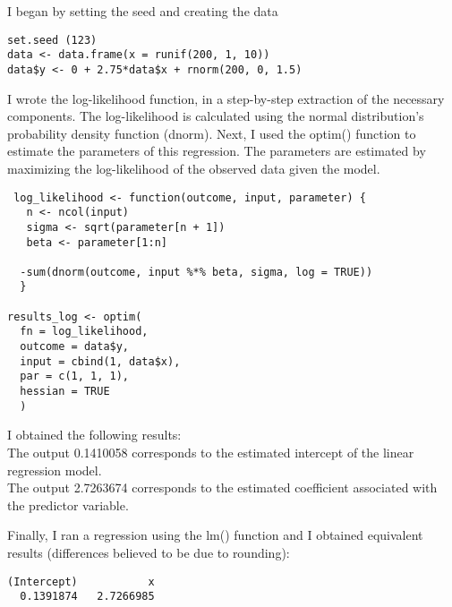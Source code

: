 \documentclass[oneside]{article}
\begin{document}
I began by setting the seed and creating the data

\begin{verbatim}
set.seed (123)
data <- data.frame(x = runif(200, 1, 10))
data$y <- 0 + 2.75*data$x + rnorm(200, 0, 1.5)

\end{verbatim}
\noindent
I wrote the log-likelihood function, in a step-by-step extraction of the necessary components. The log-likelihood is calculated using the normal distribution's probability density function (dnorm).
Next, I  used the optim() function to estimate the parameters of this regression. The parameters are estimated by maximizing the log-likelihood of the observed data given the model.

\begin{verbatim}
 log_likelihood <- function(outcome, input, parameter) {
   n <- ncol(input)
   sigma <- sqrt(parameter[n + 1])
   beta <- parameter[1:n]
  
  -sum(dnorm(outcome, input %*% beta, sigma, log = TRUE))
  }

results_log <- optim(
  fn = log_likelihood, 
  outcome = data$y, 
  input = cbind(1, data$x), 
  par = c(1, 1, 1), 
  hessian = TRUE
  )
\end{verbatim}
I obtained the following results:
\\
The output 0.1410058 corresponds to the estimated intercept of the linear regression model.
\\
The output 2.7263674 corresponds to the estimated coefficient associated with the predictor variable.

\vspace{.3cm}
\noindent
Finally, I ran a regression using the lm() function and I obtained equivalent results (differences believed to be due to rounding):
\begin{verbatim}
(Intercept)           x 
  0.1391874   2.7266985     
\end{verbatim}
\end{document}
